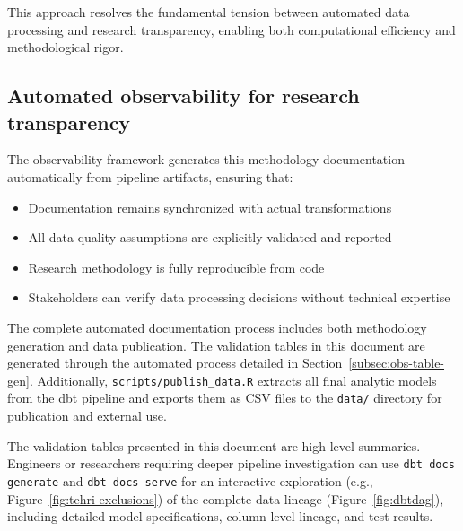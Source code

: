 \documentclass{article}
\begin{document}
This approach resolves the fundamental tension between automated data processing and research transparency, enabling both computational efficiency and methodological rigor.

\subsection{Automated observability for research transparency}

The observability framework generates this methodology documentation automatically from pipeline artifacts, ensuring that:
\begin{itemize}
    \item Documentation remains synchronized with actual transformations
    \item All data quality assumptions are explicitly validated and reported
    \item Research methodology is fully reproducible from code
    \item Stakeholders can verify data processing decisions without technical expertise
\end{itemize}

The complete automated documentation process includes both methodology generation and data publication. The validation tables in this document are generated through the automated process detailed in Section~\ref{subsec:obs-table-gen}. Additionally, \texttt{scripts/publish\_data.R} extracts all final analytic models from the dbt pipeline and exports them as CSV files to the \texttt{data/} directory for publication and external use.

The validation tables presented in this document are high-level summaries. Engineers or researchers requiring deeper pipeline investigation can use \texttt{dbt docs generate} and \texttt{dbt docs serve} for an interactive exploration (e.g., Figure~\ref{fig:tehri-exclusions}) of the complete data lineage (Figure~\ref{fig:dbtdag}), including detailed model specifications, column-level lineage, and test results. 
\end{document}

